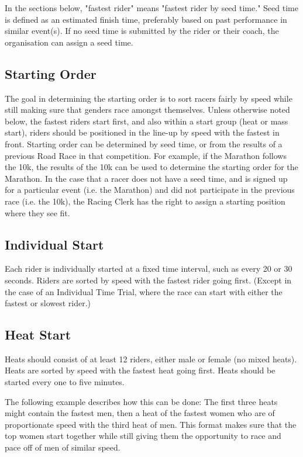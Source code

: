 In the sections below, "fastest rider" means "fastest rider by seed time." Seed time is defined as an estimated finish time, preferably based on past performance in similar event(s). If no seed time is submitted by the rider or their coach, the organisation can assign a seed time.

\subsection{Starting Order}
The goal in determining the starting order is to sort racers fairly by speed while still making sure that genders race amongst themselves. Unless otherwise noted below, the fastest riders start first, and also within a start group (heat or mass start), riders should be positioned in the line-up by speed with the fastest in front. Starting order can be determined by seed time, or from the results of a previous Road Race in that competition. For example, if the Marathon follows the 10k, the results of the 10k can be used to determine the starting order for the Marathon. In the case that a racer does not have a seed time, and is signed up for a particular event (i.e. the Marathon) and did not participate in the previous race (i.e. the 10k), the Racing Clerk has the right to assign a starting position where they see fit.

\subsection{Individual Start}
\label{road:individual_start}
Each rider is individually started at a fixed time interval, such as every 20 or 30 seconds. Riders are sorted by speed with the fastest rider going first. (Except in the case of an Individual Time Trial, where the race can start with either the fastest or slowest rider.)

\subsection{Heat Start}
\label{road:heat_start}
Heats should consist of at least 12 riders, either male or female (no mixed heats). Heats are sorted by speed with the fastest heat going first. Heats should be started every one to five minutes. 

The following example describes how this can be done: 
The first three heats might contain the fastest men, then a heat of the fastest women who are of proportionate speed with the third heat of men. This format makes sure that the top women start together while still giving them the opportunity to race and pace off of men of similar speed.

